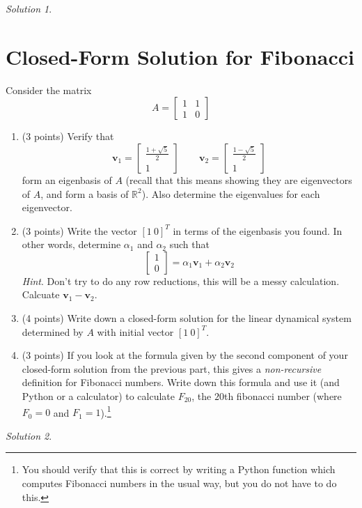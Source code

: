 \documentclass{article}
\theoremstyle{remark}
\newtheorem*{solution}{Solution}
\newcommand{\vv}[1]{\mathbf{#1}}
\newcommand{\R}{\mathbb R}
\begin{document}
\medskip

\begin{solution}
\end{solution}

\pagebreak
\section{Closed-Form Solution for Fibonacci}

Consider the matrix
\begin{displaymath}
  A =
  \begin{bmatrix}
    1 & 1 \\
    1 & 0
  \end{bmatrix}
\end{displaymath}

\begin{enumerate}
\item (3 points)
  Verify that
  \begin{displaymath}
    \vv v_1 =
    \begin{bmatrix}
      \frac{1 + \sqrt{5}}{2} \\ 1
    \end{bmatrix}
    \qquad
    \vv v_2 =
    \begin{bmatrix}
      \frac{1 - \sqrt{5}}{2} \\ 1
    \end{bmatrix}
  \end{displaymath}
  form an eigenbasis of $A$ (recall that this means showing they are eigenvectors of $A$, and form a basis of $\R^2$).
  Also determine the eigenvalues for each eigenvector.
\item (3 points)
  Write the vector $[1 \ 0]^T$ in terms of the eigenbasis you found.
  In other words, determine $\alpha_1$ and $\alpha_2$ such that
  \begin{displaymath}
    \begin{bmatrix}
      1 \\ 0
    \end{bmatrix}
    =
    \alpha_1\vv v_1 + \alpha_2 \vv v_2
  \end{displaymath}
  \textit{Hint}. Don't try to do any row reductions, this will be a messy calculation.
  Calcuate $\vv v_1 - \vv v_2$.
\item (4 points) Write down a closed-form solution for the linear dynamical system determined by $A$ with initial vector $[1 \ 0]^T$.
\item (3 points) If you look at the formula given by the second component of your closed-form solution from the previous part, this gives a \textit{non-recursive} definition for Fibonacci numbers.
  Write down this formula and use it (and Python or a calculator) to calculate $F_{20}$, the $20$th fibonacci number (where $F_0 = 0$ and $F_1 = 1$).\footnote{You should verify that this is correct by writing a Python function which computes Fibonacci numbers in the usual way, but you do not have to do this.}
\end{enumerate}

\medskip

\begin{solution}
\end{solution}
\vfill
\end{document}
